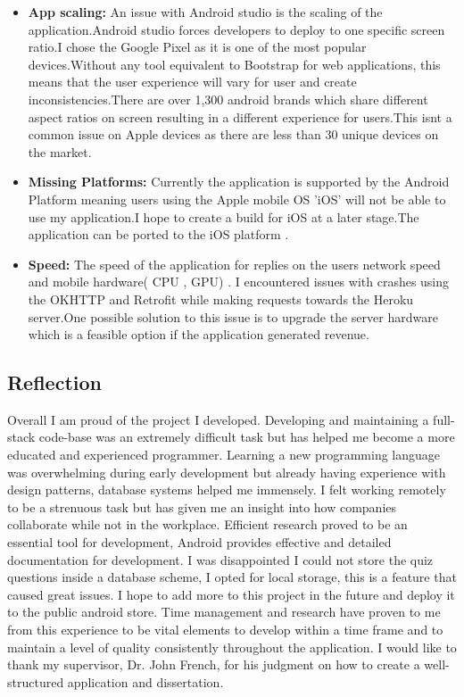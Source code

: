  \begin{itemize}
     \item \textbf{App scaling:} An issue with Android studio is the scaling of the application.Android studio forces developers to deploy to one specific screen ratio.I chose the Google Pixel as it is one of the most popular devices.Without any  tool equivalent  to Bootstrap for web applications, this means that the user experience will vary for user and create inconsistencies.There are over  1,300\cite{totalbrandandroid} android brands which share different aspect ratios on screen resulting in a different experience for users.This isnt a common issue on Apple devices as there are less than 30 unique devices on the market.
     
     \item \textbf{Missing Platforms:} Currently the application is  supported by the Android Platform meaning users using the Apple mobile OS 'iOS' will not be able to use my application.I hope to create a build for iOS at a later stage.The application can be ported to the iOS platform .
     
     \item \textbf{Speed:} The speed of the application for replies on the users network speed and mobile hardware( CPU , GPU) . I encountered issues with crashes using the OKHTTP and Retrofit while  making requests towards the Heroku server.One possible solution to this issue is to upgrade the server hardware which is a feasible option if the application generated revenue.
     
         \end{itemize}
         
\subsection{Reflection}
Overall I am proud of the project I developed. Developing and maintaining a full-stack code-base was an extremely difficult task but has helped me become a more educated and experienced programmer. Learning a new programming language was overwhelming during early development but already having experience with design patterns, database systems helped me immensely. I felt working remotely to be a strenuous task but has given me an insight into how companies collaborate while not in the workplace. Efficient research proved to be an essential tool for development, Android provides effective and detailed documentation for development. I was disappointed I could not store the quiz questions inside a database scheme, I opted for local storage, this is a feature that caused great issues. I hope to add more to this project in the future and deploy it to the public android store. Time management and research have proven to me from this experience to be vital elements to develop within a time frame and to maintain a level of quality consistently throughout the application. I would like to thank my supervisor, Dr. John French, for his judgment on how to create a well-structured application and dissertation.
